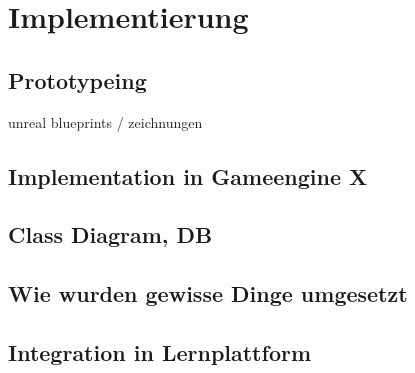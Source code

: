 \section{Implementierung}
\subsection{Prototypeing}
	unreal blueprints / zeichnungen
\subsection{Implementation in Gameengine X}
\subsection{Class Diagram, DB}
\subsection{Wie wurden gewisse Dinge umgesetzt}
\subsection{Integration in Lernplattform}
